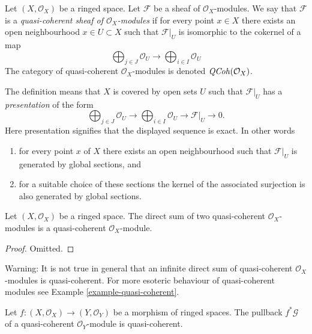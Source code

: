 \begin{definition}
\label{definition-quasi-coherent}
Let $(X, \mathcal{O}_X)$ be a ringed space.
Let $\mathcal{F}$ be a sheaf of $\mathcal{O}_X$-modules.
We say that $\mathcal{F}$ is a {\it quasi-coherent
sheaf of $\mathcal{O}_X$-modules} if for every
point $x \in X$ there exists an open neighbourhood
$x\in U \subset X$ such that $\mathcal{F}|_U$
is isomorphic to the cokernel of a map
$$
\bigoplus\nolimits_{j \in J}
\mathcal{O}_U
\longrightarrow
\bigoplus\nolimits_{i \in I}
\mathcal{O}_U
$$
The category of quasi-coherent $\mathcal{O}_X$-modules
is denoted $\mathit{QCoh}(\mathcal{O}_X)$.
\end{definition}

\noindent
The definition means that $X$ is covered by open sets $U$
such that $\mathcal{F}|_U$ has a {\it presentation}
of the form
$$
\bigoplus\nolimits_{j \in J}
\mathcal{O}_U
\longrightarrow
\bigoplus\nolimits_{i \in I}
\mathcal{O}_U
\longrightarrow
\mathcal{F}|_U
\longrightarrow
0.
$$
Here presentation signifies that the displayed
sequence is exact. In other words
\begin{enumerate}
\item for every point $x$ of $X$ there exists
an open neighbourhood such that $\mathcal{F}|_U$
is generated by global sections, and
\item for a suitable choice of these sections
the kernel of the associated surjection is also
generated by global sections.
\end{enumerate}

\begin{lemma}
\label{lemma-direct-sum-quasi-coherent}
Let $(X, \mathcal{O}_X)$ be a ringed space.
The direct sum of two quasi-coherent $\mathcal{O}_X$-modules is
a quasi-coherent $\mathcal{O}_X$-module.
\end{lemma}

\begin{proof}
Omitted.
\end{proof}

\begin{remark}
\label{remark-infinite-direct-sum-quasi-coherent-not}
Warning: It is not true in general that an infinite
direct sum of quasi-coherent $\mathcal{O}_X$-modules
is quasi-coherent. For more esoteric behaviour of quasi-coherent
modules see Example \ref{example-quasi-coherent}.
\end{remark}

\begin{lemma}
\label{lemma-pullback-quasi-coherent}
Let $f : (X, \mathcal{O}_X) \to (Y, \mathcal{O}_Y)$
be a morphism of ringed spaces.
The pullback $f^*\mathcal{G}$ of a quasi-coherent
$\mathcal{O}_Y$-module is quasi-coherent.
\end{lemma}


